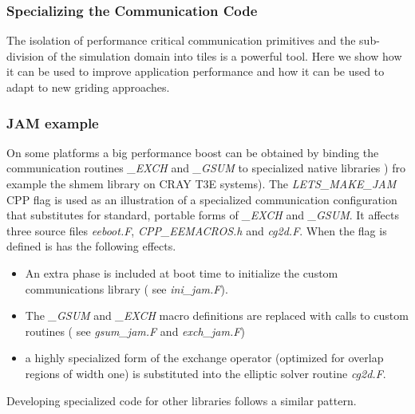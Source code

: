 \subsubsection{Specializing the Communication Code}

The isolation of performance critical communication primitives and the
sub-division of the simulation domain into tiles is a powerful tool.
Here we show how it can be used to improve application performance and
how it can be used to adapt to new griding approaches.

\subsubsection{JAM example}
\label{sect:jam_example}
On some platforms a big performance boost can be obtained by
binding the communication routines {\em \_EXCH} and
{\em \_GSUM} to specialized native libraries ) fro example the
shmem library on CRAY T3E systems). The {\em LETS\_MAKE\_JAM} CPP flag 
is used as an illustration of a specialized communication configuration 
that substitutes for standard, portable forms of {\em \_EXCH} and 
{\em \_GSUM}. It affects three source files {\em eeboot.F}, 
{\em CPP\_EEMACROS.h} and {\em cg2d.F}. When the flag is defined
is has the following effects.
\begin{itemize}
\item An extra phase is included at boot time to initialize the custom 
communications library ( see {\em ini\_jam.F}).
\item The {\em \_GSUM} and {\em \_EXCH} macro definitions are replaced
with calls to custom routines ( see {\em gsum\_jam.F} and {\em exch\_jam.F})
\item a highly specialized form of the exchange operator (optimized
for overlap regions of width one) is substituted into the elliptic
solver routine {\em cg2d.F}.
\end{itemize}
Developing specialized code for other libraries follows a similar
pattern.


